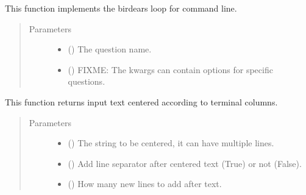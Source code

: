 \documentclass[letterpaper,10pt,english]{sphinxmanual}
\begin{document}
\begin{fulllineitems}
\label{\detokenize{index:birdears.interfaces.commandline.CommandLine}}
This function implements the birdears loop for command line.
\begin{quote}\begin{description}
\item[{Parameters}] \leavevmode\begin{itemize}
\item {} 
 () \textendash{} The question name.

\item {} 
 () \textendash{} FIXME: The kwargs can contain options for specific
questions.

\end{itemize}

\end{description}\end{quote}

\end{fulllineitems}


\begin{fulllineitems}
\label{\detokenize{index:birdears.interfaces.commandline.center_text}}
This function returns input text centered according to terminal columns.
\begin{quote}\begin{description}
\item[{Parameters}] \leavevmode\begin{itemize}
\item {} 
 () \textendash{} The string to be centered, it can have multiple lines.

\item {} 
 () \textendash{} Add line separator after centered text (True) or
not (False).

\item {} 
 () \textendash{} How many new lines to add after text.

\end{itemize}

\end{description}\end{quote}

\end{fulllineitems}
\end{document}
